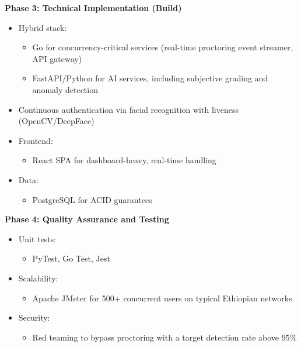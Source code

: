 \begin{itemize}[leftmargin=1.4em]
    \begin{sloppypar}
    \item \textbf{Phase 3: Technical Implementation (Build)}
    \begin{itemize}
        \item Hybrid stack:
        \begin{itemize}
            \item Go for concurrency-critical services (real-time proctoring event streamer, API gateway)
            \item FastAPI/Python for AI services, including subjective grading and anomaly detection
        \end{itemize}
        \item Continuous authentication via facial recognition with liveness (OpenCV/DeepFace)
        \item Frontend:
        \begin{itemize}
            \item React SPA for dashboard-heavy, real-time handling
        \end{itemize}
        \item Data:
        \begin{itemize}
            \item PostgreSQL for ACID guarantees
        \end{itemize}
    \end{itemize}
    \end{sloppypar}
    
    \item \textbf{Phase 4: Quality Assurance and Testing}
    \begin{itemize}
        \item Unit tests:
        \begin{itemize}
            \item PyTest, Go Test, Jest
        \end{itemize}
        \item Scalability:
        \begin{itemize}
            \item Apache JMeter for 500+ concurrent users on typical Ethiopian networks
        \end{itemize}
        \item Security:
        \begin{itemize}
            \item Red teaming to bypass proctoring with a target detection rate above 95\%
        \end{itemize}
    \end{itemize}
    

\end{itemize}
